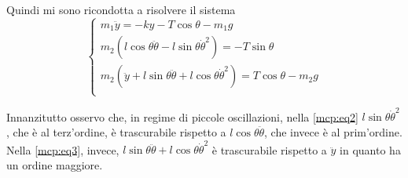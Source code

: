 \documentclass[../main.tex]{subfiles}
\begin{document}
Quindi mi sono ricondotta a risolvere il sistema
\begin{equation*}
\begin{cases}
	m_1\ddot{y}=-ky-T\cos\theta-m_1g\\ %
	m_2(l\cos\theta \ddot\theta-l\sin\theta\dot\theta^2)=-T\sin\theta \\ %
	m_2(\ddot{y}+l\sin\theta\ddot\theta+l\cos\theta\dot\theta^2)=T\cos\theta-m_2g \\ %
\end{cases}
\end{equation*}

Innanzitutto osservo che, in regime di piccole oscillazioni, nella \cref{mcp:eq2} $l\sin\theta\dot\theta^2$, 
che è al terz'ordine,
è trascurabile rispetto a $l\cos\theta \ddot\theta$, che invece è al prim'ordine.
Nella \cref{mcp:eq3}, invece, $l\sin\theta\ddot\theta+l\cos\theta\dot\theta^2$ è trascurabile rispetto
a $\ddot{y}$ in quanto ha un ordine maggiore.
\end{document}
